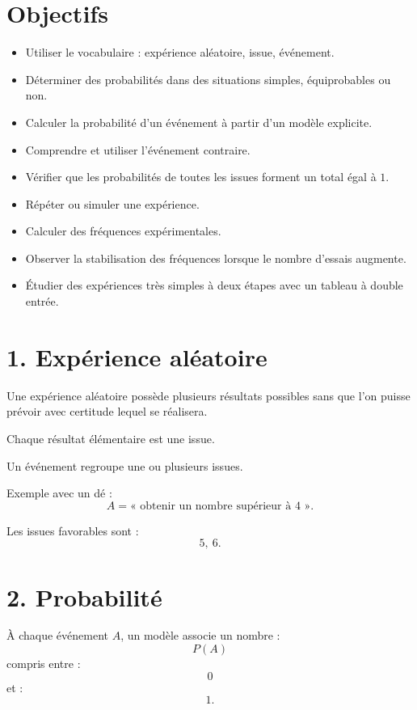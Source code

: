 
\section{Objectifs}

\begin{itemize}
\item Utiliser le vocabulaire : expérience aléatoire, issue, événement.
\item Déterminer des probabilités dans des situations simples, équiprobables ou non.
\item Calculer la probabilité d'un événement à partir d'un modèle explicite.
\item Comprendre et utiliser l'événement contraire.
\item Vérifier que les probabilités de toutes les issues forment un total égal à $1$.
\item Répéter ou simuler une expérience.
\item Calculer des fréquences expérimentales.
\item Observer la stabilisation des fréquences lorsque le nombre d'essais augmente.
\item Étudier des expériences très simples à deux étapes avec un tableau à double entrée.
\end{itemize}

\section{1. Expérience aléatoire}

Une expérience aléatoire possède plusieurs résultats possibles sans que l'on puisse prévoir avec certitude lequel se réalisera.

Chaque résultat élémentaire est une issue.

Un événement regroupe une ou plusieurs issues.

Exemple avec un dé :
\[
A=\text{« obtenir un nombre supérieur à }4\text{ »}.
\]

Les issues favorables sont :
\[
5,\ 6.
\]

\section{2. Probabilité}

À chaque événement $A$, un modèle associe un nombre :
\[
P(A)
\]
compris entre :
\[
0
\]
et :
\[
1.
\]

